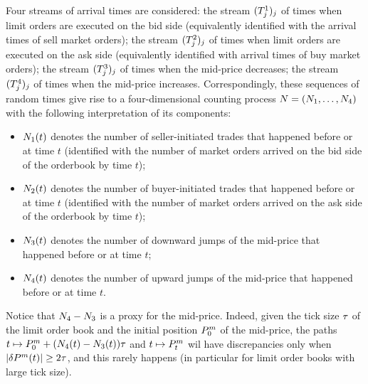\documentclass[10pt, article,table]{article}
\begin{document}
Four streams of arrival times are considered: the stream $(\arrivalTimes[1]_j)_j$ of times when limit orders are executed on the bid side (equivalently identified with the arrival times of sell market orders); the stream  $(\arrivalTimes[2]_j)_j$ of times when limit orders are executed on the ask side (equivalently identified with arrival times of buy market orders); the stream  $(\arrivalTimes[3]_j)_j$ of times when the mid-price decreases; the stream  $(\arrivalTimes[4]_j)_j$ of times when the mid-price increases. Correspondingly, these sequences of random times give rise to a four-dimensional counting process $\multiCountingProc=(\countingProc[1],\dots, \countingProc[4])$ with the following interpretation of its components:
\begin{itemize}
 \item $\countingProc[1](t)$ denotes the number of seller-initiated trades that happened before or at time $t$ (identified with the number of market orders arrived on the bid side of the orderbook by time $t$);
 \item $\countingProc[2](t)$ denotes the number of buyer-initiated trades that happened before or at time $t$ (identified with the number of market orders arrived on the ask side of the orderbook by time $t$);
 \item $\countingProc[3](t)$ denotes the number of downward jumps of the mid-price  that happened before or at time $t$;
 \item $\countingProc[4](t)$ denotes the number of upward jumps of the mid-price  that happened before or at time $t$.
\end{itemize}

Notice that $\countingProc[4]-\countingProc[3]$ is a proxy for the mid-price. Indeed, given the tick size $\tickSizeOfLOB$ of the limit order book and the initial position $\midprice_0$ of the mid-price,  the paths $t\mapsto \midprice_0 +(\countingProc[4](t)-\countingProc[3](t))\tickSizeOfLOB$ and $t\mapsto \midprice_t$ wil have discrepancies only when $\vert\delta\midprice(t)\vert \geq 2\tickSizeOfLOB$, and this rarely happens (in particular for limit order books with large tick size).
\end{document}
